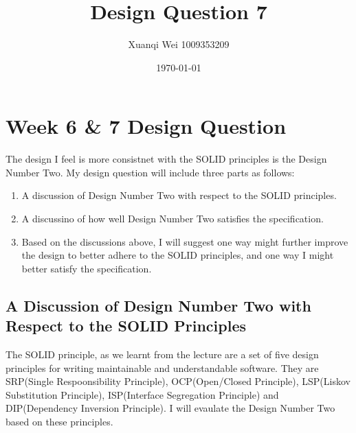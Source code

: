 \documentclass[12pt]{article}
\title{Design Question 7}
\author{Xuanqi Wei 1009353209}
\date{\today}
\begin{document}
\maketitle

\setcounter{page}{1}

\section{Week 6 \& 7 Design Question}
The design I feel is more consistnet with the SOLID principles is the Design Number Two. My design question will include three parts as follows:

\begin{enumerate}
    \item A discussion of Design Number Two with respect to the SOLID principles.
    \item A discussino of how well Design Number Two satisfies the specification.
    \item Based on the discussions above, I will suggest one way might further improve the design to better adhere to the SOLID principles, and one way I might better satisfy the specification.
\end{enumerate}

\subsection{A Discussion of Design Number Two with Respect to the SOLID Principles}

The SOLID principle, as we learnt from the lecture are a set of five design principles for writing maintainable and understandable software. They are SRP(Single Respoonsibility Principle), OCP(Open/Closed Principle), LSP(Liskov Substitution Principle), ISP(Interface Segregation Principle) and DIP(Dependency Inversion Principle).
I will evaulate the Design Number Two based on these principles.
\end{document}
